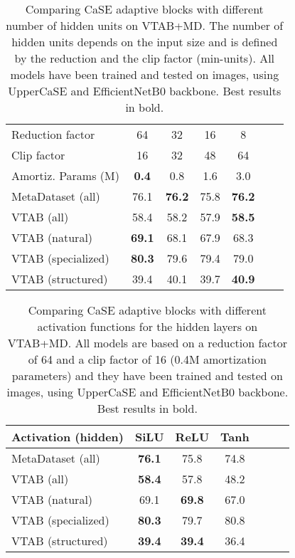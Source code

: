 \documentclass{article}
\begin{document}
\begin{table}[H]
\caption{Comparing CaSE adaptive blocks with different number of hidden units on VTAB+MD. The number of hidden units depends on the input size and is defined by the reduction and the clip factor (min-units). All models have been trained and tested on  images, using UpperCaSE and EfficientNetB0 backbone. Best results in bold.}
\vskip 0.15in
\begin{center}
\begin{tabular}{lcccccc}
\toprule
Reduction factor & 64 & 32 & 16 & 8\\
Clip factor & 16 & 32 & 48 & 64\\
Amortiz. Params (M) & \textbf{0.4} & 0.8 & 1.6 & 3.0\\
\midrule
MetaDataset (all) & 76.1 & \textbf{76.2} & 75.8 & \textbf{76.2}\\
VTAB (all) & 58.4 & 58.2 & 57.9 & \textbf{58.5}\\
VTAB (natural) & \textbf{69.1} & 68.1 & 67.9 & 68.3\\
VTAB (specialized) & \textbf{80.3} & 79.6 & 79.4 & 79.0\\
VTAB (structured) & 39.4 & 40.1 & 39.7 & \textbf{40.9}\\
\bottomrule
\end{tabular}
\label{tab:ablation_hidden_units}
\end{center}
\vskip -0.1in
\end{table}

\begin{table}[H]
\caption{Comparing CaSE adaptive blocks with different activation functions for the hidden layers on VTAB+MD. All models are based on a reduction factor of 64 and a clip factor of 16 (0.4M amortization parameters) and they have been trained and tested on  images, using UpperCaSE and EfficientNetB0 backbone. Best results in bold.}
\vskip 0.15in
\begin{center}
\begin{tabular}{lcccccc}
\toprule
Activation (hidden) & SiLU & ReLU & Tanh\\
\midrule
MetaDataset (all) & \textbf{76.1} & 75.8 & 74.8\\
VTAB (all) & \textbf{58.4} & 57.8 & 48.2\\
VTAB (natural) & 69.1 & \textbf{69.8} & 67.0\\
VTAB (specialized) & \textbf{80.3} & 79.7 & 80.8\\
VTAB (structured) & \textbf{39.4} & \textbf{39.4} & 36.4\\
\bottomrule
\end{tabular}
\label{tab:ablation_hidden_activation}
\end{center}
\vskip -0.1in
\end{table}
\end{document}
